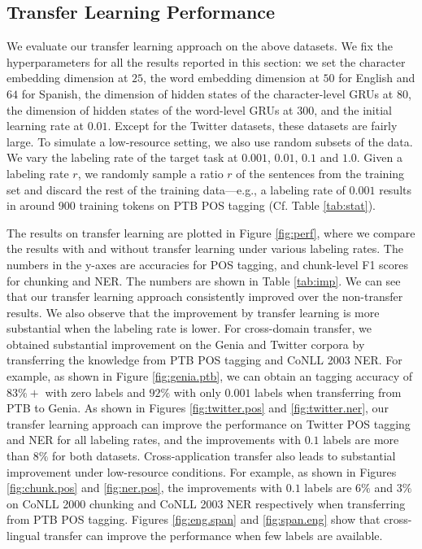 \documentclass{article} \usepackage{iclr2017_conference,times}
\begin{document}
\subsection{Transfer Learning Performance} \label{sec:transfer}

We evaluate our transfer learning approach on the above datasets. We fix the hyperparameters for all the results reported in this section: we set the character embedding dimension at $25$, the word embedding dimension at $50$ for English and $64$ for Spanish, the dimension of hidden states of the character-level GRUs at $80$, the dimension of hidden states of the word-level GRUs at $300$, and the initial learning rate at $0.01$. Except for the Twitter datasets, these datasets are fairly large.  To simulate a low-resource setting, we also use random subsets of the data. We vary the labeling rate of the target task at $0.001$, $0.01$, $0.1$ and $1.0$. Given a labeling rate $r$, we randomly sample a ratio $r$ of the sentences from the training set and discard the rest of the training data---e.g., a labeling rate of $0.001$ results in around 900 training tokens on PTB POS tagging (Cf. Table \ref{tab:stat}).

The results on transfer learning are plotted in Figure \ref{fig:perf}, where we compare the results with and without transfer learning under various labeling rates. The numbers in the y-axes are accuracies for POS tagging, and chunk-level F1 scores for chunking and NER. The numbers are shown in Table \ref{tab:imp}. We can see that our transfer learning approach consistently improved over the non-transfer results. We also observe that the improvement by transfer learning is more substantial when the labeling rate is lower. For cross-domain transfer, we obtained substantial improvement on the Genia and Twitter corpora by transferring the knowledge from PTB POS tagging and CoNLL 2003 NER. For example, as shown in Figure \ref{fig:genia.ptb}, we can obtain an tagging accuracy of $83\%+$ with zero labels and $92\%$ with only $0.001$ labels when transferring from PTB to Genia. As shown in Figures \ref{fig:twitter.pos} and \ref{fig:twitter.ner}, our transfer learning approach can improve the performance on Twitter POS tagging and NER for all labeling rates, and the improvements with $0.1$ labels are more than $8\%$ for both datasets. Cross-application transfer also leads to substantial improvement under low-resource conditions. For example, as shown in Figures \ref{fig:chunk.pos} and \ref{fig:ner.pos}, the improvements with $0.1$ labels are $6\%$ and $3\%$ on CoNLL 2000 chunking and CoNLL 2003 NER respectively when transferring from PTB POS tagging. Figures \ref{fig:eng.span} and \ref{fig:span.eng} show that cross-lingual transfer can improve the performance when few labels are available.
\end{document}
